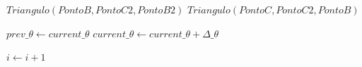 \begin{landscape}
\begin{algorithm}
\begin{center}
\begin{algorithmic}[1]
\State$Triangulo(Ponto B, Ponto C2, Ponto B2)$
\State$Triangulo(Ponto C, Ponto C2, Ponto B)$



\State$prev\_\theta \gets current\_\theta$
\State$current\_\theta \gets current\_\theta + \Delta\_\theta$

\State$i \gets i + 1$


\EndWhile{}
\end{algorithmic}
\end{center}

\end{algorithm}


\end{landscape}
\restoregeometry{}
